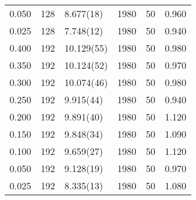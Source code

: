 \begin{tabular}{rrlrrr}
 0.050 &     128 & 8.677(18)  &                1980 &                  50 &    0.960 \\
 0.025 &     128 & 7.748(12)  &                1980 &                  50 &    0.940 \\
 0.400 &     192 & 10.129(55) &                1980 &                  50 &    0.980 \\
 0.350 &     192 & 10.124(52) &                1980 &                  50 &    0.970 \\
 0.300 &     192 & 10.074(46) &                1980 &                  50 &    0.980 \\
 0.250 &     192 & 9.915(44)  &                1980 &                  50 &    0.940 \\
 0.200 &     192 & 9.891(40)  &                1980 &                  50 &    1.120 \\
 0.150 &     192 & 9.848(34)  &                1980 &                  50 &    1.090 \\
 0.100 &     192 & 9.659(27)  &                1980 &                  50 &    1.120 \\
 0.050 &     192 & 9.128(19)  &                1980 &                  50 &    0.970 \\
 0.025 &     192 & 8.335(13)  &                1980 &                  50 &    1.080 \\
\hline
\end{tabular}
